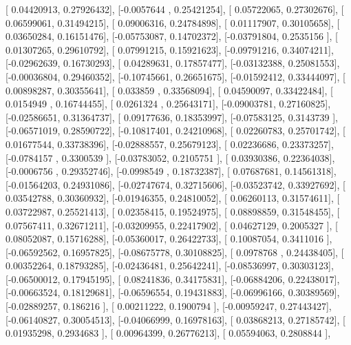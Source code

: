 \documentclass{article}
\begin{document}
       [ 0.04420913,  0.27926432],
       [-0.0057644 ,  0.25421254],
       [ 0.05722065,  0.27302676],
       [ 0.06599061,  0.31494215],
       [ 0.09006316,  0.24784898],
       [ 0.01117907,  0.30105658],
       [ 0.03650284,  0.16151476],
       [-0.05753087,  0.14702372],
       [-0.03791804,  0.2535156 ],
       [ 0.01307265,  0.29610792],
       [ 0.07991215,  0.15921623],
       [-0.09791216,  0.34074211],
       [-0.02962639,  0.16730293],
       [ 0.04289631,  0.17857477],
       [-0.03132388,  0.25081553],
       [-0.00036804,  0.29460352],
       [-0.10745661,  0.26651675],
       [-0.01592412,  0.33444097],
       [ 0.00898287,  0.30355641],
       [ 0.033859  ,  0.33568094],
       [ 0.04590097,  0.33422484],
       [ 0.0154949 ,  0.16744455],
       [ 0.0261324 ,  0.25643171],
       [-0.09003781,  0.27160825],
       [-0.02586651,  0.31364737],
       [ 0.09177636,  0.18353997],
       [-0.07583125,  0.3143739 ],
       [-0.06571019,  0.28590722],
       [-0.10817401,  0.24210968],
       [ 0.02260783,  0.25701742],
       [ 0.01677544,  0.33738396],
       [-0.02888557,  0.25679123],
       [ 0.02236686,  0.23373257],
       [-0.0784157 ,  0.3300539 ],
       [-0.03783052,  0.2105751 ],
       [ 0.03930386,  0.22364038],
       [-0.0006756 ,  0.29352746],
       [-0.0998549 ,  0.18732387],
       [ 0.07687681,  0.14561318],
       [-0.01564203,  0.24931086],
       [-0.02747674,  0.32715606],
       [-0.03523742,  0.33927692],
       [ 0.03542788,  0.30360932],
       [-0.01946355,  0.24810052],
       [ 0.06260113,  0.31574611],
       [ 0.03722987,  0.25521413],
       [ 0.02358415,  0.19524975],
       [ 0.08898859,  0.31548455],
       [ 0.07567411,  0.32671211],
       [-0.03209955,  0.22417902],
       [ 0.04627129,  0.2005327 ],
       [ 0.08052087,  0.15716288],
       [-0.05360017,  0.26422733],
       [ 0.10087054,  0.3411016 ],
       [-0.06592562,  0.16957825],
       [-0.08675778,  0.30108825],
       [ 0.0978768 ,  0.24438405],
       [ 0.00352264,  0.18793285],
       [-0.02436481,  0.25642241],
       [-0.08536997,  0.30303123],
       [-0.06500012,  0.17945195],
       [ 0.08241836,  0.34175831],
       [-0.06884206,  0.22438017],
       [-0.00663524,  0.18129681],
       [-0.06596554,  0.19431883],
       [-0.06996166,  0.30389569],
       [-0.02889257,  0.186216  ],
       [ 0.00211222,  0.1900794 ],
       [-0.00959247,  0.27443427],
       [-0.06140827,  0.30054513],
       [-0.04066999,  0.16978163],
       [ 0.03868213,  0.27185742],
       [ 0.01935298,  0.2934683 ],
       [ 0.00964399,  0.26776213],
       [ 0.05594063,  0.2808844 ],
\end{document}
